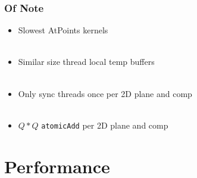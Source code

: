 \documentclass{beamer}
\begin{document}
\begin{frame}
\begin{center}
\frametitle{Of Note}

\begin{itemize}

\item Slowest AtPoints kernels\\

~\\

\item Similar size thread local temp buffers\\

~\\

\item Only sync threads once per 2D plane and comp\\

~\\

\item $Q*Q$ \lstinline{atomicAdd} per 2D plane and comp\\

\end{itemize}

\end{center}
\end{frame}

\section{Performance}
\end{document}

